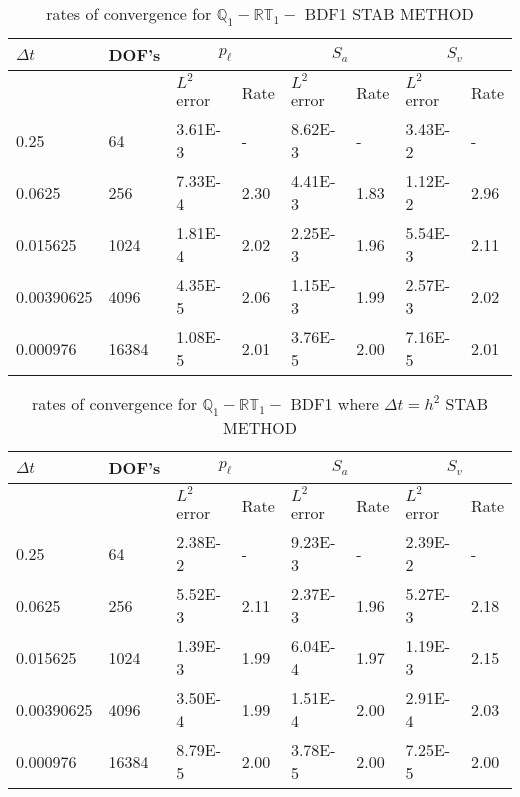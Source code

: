 \begin{table}[ht]
	\centering
	\begin{tabular}{|l|l|l||l|l||l|l|l|}
		\hline
		$\Delta t$ & DOF's & \multicolumn{2}{c|}{$p_{\ell}$} & \multicolumn{2}{c|}{$S_a$} & \multicolumn{2}{c|}{$S_v$}  \\ \hline
		& & $L^2$ error & Rate & $L^2$ error & Rate & $L^2$ error & Rate \\ \hline
		0.25   	  & 64    & 3.61E-3 & -	   & 8.62E-3 & -    & 3.43E-2 & - \\ \hline
		0.0625    & 256   & 7.33E-4 & 2.30 & 4.41E-3 & 1.83 & 1.12E-2 & 2.96 \\ \hline
		0.015625  & 1024  & 1.81E-4 & 2.02 & 2.25E-3 & 1.96 & 5.54E-3 & 2.11 \\ \hline
		0.00390625& 4096  & 4.35E-5 & 2.06 & 1.15E-3 & 1.99 & 2.57E-3 & 2.02 \\ \hline 
		0.000976  & 16384 & 1.08E-5 & 2.01 & 3.76E-5 & 2.00 & 7.16E-5 & 2.01  \\ \hline
	\end{tabular}
	\caption[Template table-description for list of tables.]{ rates of convergence for $\mathbb{Q}_1 - \mathbb{RT}_1 -$ BDF1  STAB METHOD }
\end{table}


\begin{table}[ht]
	\centering
	\begin{tabular}{|l|l|l||l|l||l|l|l|}
		\hline
		$\Delta t$ & DOF's & \multicolumn{2}{c|}{$p_{\ell}$} & \multicolumn{2}{c|}{$S_a$} & \multicolumn{2}{c|}{$S_v$}  \\ \hline
		& & $L^2$ error & Rate & $L^2$ error & Rate & $L^2$ error & Rate \\ \hline
		0.25   	  & 64    & 2.38E-2 & -	   & 9.23E-3 & -    & 2.39E-2 & - \\ \hline
		0.0625    & 256   & 5.52E-3 & 2.11 & 2.37E-3 & 1.96 & 5.27E-3 & 2.18 \\ \hline
		0.015625  & 1024  & 1.39E-3 & 1.99 & 6.04E-4 & 1.97 & 1.19E-3 & 2.15 \\ \hline
		0.00390625& 4096  & 3.50E-4 & 1.99 & 1.51E-4 & 2.00 & 2.91E-4 & 2.03 \\ \hline 
		0.000976  & 16384 & 8.79E-5 & 2.00 & 3.78E-5 & 2.00 & 7.25E-5 & 2.00  \\ \hline
	\end{tabular}
	\caption[Template table-description for list of tables.]{ rates of convergence for $\mathbb{Q}_1 - \mathbb{RT}_1-$ BDF1 where $\Delta t = h^2$ STAB METHOD }
\end{table}

